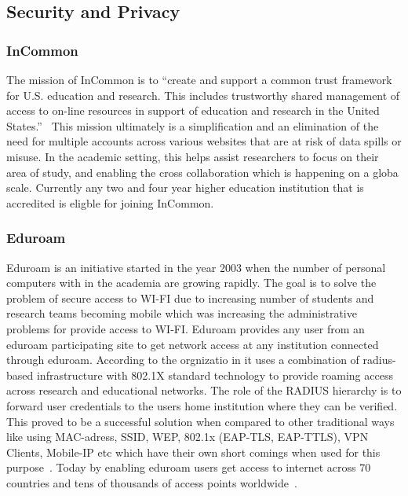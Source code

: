 \subsection{Security and Privacy}

\subsubsection{InCommon \cv}

The mission of InCommon is to ``create and support a common trust
framework for U.S. education and research.  This includes trustworthy
shared management of access to on-line resources in support of
education and research in the United States.''~\cite{www-incommon}
This mission ultimately is a simplification and an elimination of the
need for multiple accounts across various websites that are at risk of
data spills or misuse.  In the academic setting, this helps assist
researchers to focus on their area of study, and enabling the cross
collaboration which is happening on a globa scale.  Currently any two
and four year higher education institution that is accredited is
eligble for joining InCommon.

\subsubsection{Eduroam}

Eduroam is an initiative started in the year 2003 when the number of
personal computers with in the academia are growing rapidly. The goal
is to solve the problem of secure access to WI-FI due to increasing
number of students and research teams becoming mobile which was
increasing the administrative problems for provide access to
WI-FI. Eduroam provides any user from an eduroam participating site to
get network access at any institution connected through
eduroam. According to the orgnizatio in it uses a combination of
radius-based infrastructure with 802.1X standard technology to provide
roaming access across research and educational networks. The role of
the RADIUS hierarchy is to forward user credentials to the users home
institution where they can be verified. This proved to be a successful
solution when compared to other traditional ways like using
MAC-adress, SSID, WEP, 802.1x (EAP-TLS, EAP-TTLS), VPN Clients,
Mobile-IP etc which have their own short comings when used for this
purpose~\cite{eduroam-paper-2005}. Today by enabling eduroam users get
access to internet across 70 countries and tens of thousands of access
points worldwide~\cite{www-eduroam}.


